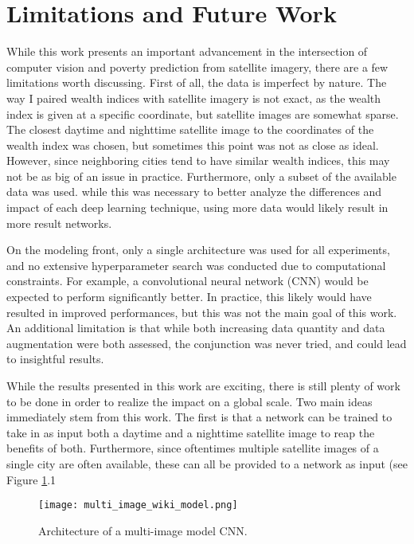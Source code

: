 \documentclass{article}
\begin{document}
\section{Limitations and Future Work}
While this work presents an important advancement in the intersection of computer vision and poverty prediction from satellite imagery, there are a few limitations worth discussing. First of all, the data is imperfect by nature. The way I paired wealth indices with satellite imagery is not exact, as the wealth index is given at a specific coordinate, but satellite images are somewhat sparse. The closest daytime and nighttime satellite image to the coordinates of the wealth index was chosen, but sometimes this point was not as close as ideal. However, since neighboring cities tend to have similar wealth indices, this may not be as big of an issue in practice. Furthermore, only a subset of the available data was used. while this was necessary to better analyze the differences and impact of each deep learning technique, using more data would likely result in more result networks.

On the modeling front, only a single architecture was used for all experiments, and no extensive hyperparameter search was conducted due to computational constraints. For example, a convolutional neural network (CNN) would be expected to perform significantly better. In practice, this likely would have resulted in improved performances, but this was not the main goal of this work. An additional limitation is that while both increasing data quantity and data augmentation were both assessed, the conjunction was never tried, and could lead to insightful results.

While the results presented in this work are exciting, there is still plenty of work to be done in order to realize the impact on a global scale. Two main ideas immediately stem from this work. The first is that a network can be trained to take in as input both a daytime and a nighttime satellite image to reap the benefits of both. Furthermore, since oftentimes multiple satellite images of a single city are often available, these can all be provided to a network as input (see Figure \ref{fig:Multi_Image_CNN}.1



\begin{figure}[t]
    \centering
    \texttt{[image: multi\_image\_wiki\_model.png]}
    \caption{Architecture of a multi-image model CNN.}
    \label{fig:Multi_Image_CNN}
\end{figure}
\end{document}
